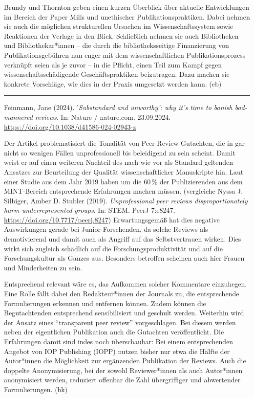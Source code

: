 \documentclass[a4paper,
fontsize=11pt,
oneside,
numbers=noperiodatend,
parskip=half-,
bibliography=totoc,
final
]{scrartcl}
\begin{document}
Brundy und Thornton geben einen kurzen Überblick über aktuelle
Entwicklungen im Bereich der Paper Mills und unethischer
Publikationspraktiken. Dabei nehmen sie auch die möglichen strukturellen
Ursachen im Wissenschaftssystem sowie Reaktionen der Verlage in den
Blick. Schließlich nehmen sie auch Bibliotheken und Bibliothekar*innen
-- die durch die bibliotheksseitige Finanzierung von
Publikationsgebühren nun enger mit dem wissenschaftlichen
Publikationsprozess verknüpft seien als je zuvor -- in die Pflicht,
einen Teil zum Kampf gegen wissenschaftsschädigende Geschäftspraktiken
beizutragen. Dazu machen sie konkrete Vorschläge, wie dies in der Praxis
umgesetzt werden kann. (eb)

\begin{center}\rule{0.5\linewidth}{0.5pt}\end{center}

Feinmann, Jane (2024). '\emph{Substandard and unworthy': why it's time
to banish bad-mannered reviews}. In: Nature / nature.com. 23.09.2024.
\url{https://doi.org/10.1038/d41586-024-02943-z}

Der Artikel problematisiert die Tonalität von Peer-Review-Gutachten, die
in gar nicht so wenigen Fällen unprofessionell bis beleidigend zu sein
scheint. Damit weist er auf einen weiteren Nachteil des nach wie vor als
Standard geltenden Ansatzes zur Beurteilung der Qualität
wissenschaftlicher Manuskripte hin. Laut einer Studie aus dem Jahr 2019
haben um die 60\,\% der Publizierenden aus dem MINT-Bereich
entsprechende Erfahrungen machen müssen. (vergleiche Nyssa J. Silbiger,
Amber D. Stubler (2019). \emph{Unprofessional peer reviews
disproportionately harm underrepresented groups}. In: STEM. PeerJ
7:e8247, \url{https://doi.org/10.7717/peerj.8247}) Erwartungsgemäß hat
dies negative Auswirkungen gerade bei Junior-Forschenden, da solche
Reviews als demotivierend und damit auch als Angriff auf das
Selbstvertrauen wirken. Dies wirkt sich zugleich schädlich auf die
Forschungsproduktivität und auf die Forschungskultur als Ganzes aus.
Besonders betroffen scheinen auch hier Frauen und Minderheiten zu sein.

Entsprechend relevant wäre es, das Aufkommen solcher Kommentare
einzuhegen. Eine Rolle fällt dabei den Redakteur*innen der Journals zu,
die entsprechende Formulierungen erkennen und entfernen können. Zudem
können die Begutachtenden entsprechend sensibilisiert und geschult
werden. Weiterhin wird der Ansatz eines ``transparent peer review''
vorgeschlagen. Bei diesem werden neben der eigentlichen Publikation auch
die Gutachten veröffentlicht. Die Erfahrungen damit sind indes noch
überschaubar: Bei einem entsprechenden Angebot von IOP Publishing (IOPP)
nutzen bisher nur etwa die Hälfte der Autor*innen die Möglichkeit zur
ergänzenden Publikation der Reviews. Auch die doppelte Anonymisierung,
bei der sowohl Reviewer*innen als auch Autor*innen anonymisiert werden,
reduziert offenbar die Zahl übergriffiger und abwertender
Formulierungen. (bk)
\end{document}

